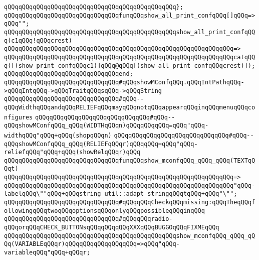 \verb|qQQqqQQqqQQqqQQqqQQqqQQqqQQqqQQqqQQqqQQqqQQqqQQq};|\newline
\newline
\verb|qQQqqQQqqQQqqQQqqQQqqQQqqQQqqQQqfunqQQqshow_all_print_confqQQq[]qQQq=>qQQq"";|\newline
\verb|qQQqqQQqqQQqqQQqqQQqqQQqqQQqqQQqqQQqqQQqqQQqqQQqshow_all_print_confqQQq(c1qQQq!qQQqcrest)|\newline
\verb|qQQqqQQqqQQqqQQqqQQqqQQqqQQqqQQqqQQqqQQqqQQqqQQqqQQqqQQqqQQqqQQq=>|\newline
\verb|qQQqqQQqqQQqqQQqqQQqqQQqqQQqqQQqqQQqqQQqqQQqqQQqqQQqqQQqqQQqqQQqcatqQQq([(show_print_confqQQqc1)]qQQq@qQQq[(show_all_print_confqQQqcrest)]);|\newline
\verb|qQQqqQQqqQQqqQQqqQQqqQQqqQQqqQQqend;|\newline
\newline
\verb|qQQqqQQqqQQqqQQqqQQqqQQqqQQqqQQq#qQQqshowMConfqQQq.qQQqIntPathqQQq->qQQqIntqQQq->qQQqTraitqQQqsqQQq->qQQqString|\newline
\verb|qQQqqQQqqQQqqQQqqQQqqQQqqQQqqQQq#qQQq--qQQqWidthqQQqandqQQqRELIEFqQQqmayqQQqnotqQQqappearqQQqinqQQqmenuqQQqconfigures|\newline
\verb|qQQqqQQqqQQqqQQqqQQqqQQqqQQqqQQq#qQQq--qQQqshowMConfqQQq_qQQq(WIDTHqQQqn)qQQqqQQqqQQq=qQQq"qQQq-widthqQQq"qQQq+qQQq(shopqQQqn)|\newline
\verb|qQQqqQQqqQQqqQQqqQQqqQQqqQQqqQQq#qQQq--qQQqshowMConfqQQq_qQQq(RELIEFqQQqr)qQQqqQQq=qQQq"qQQq-reliefqQQq"qQQq+qQQq(showRelqQQqr)qQQq|\newline
\newline
\verb|qQQqqQQqqQQqqQQqqQQqqQQqqQQqqQQqfunqQQqshow_mconfqQQq_qQQq_qQQq(TEXTqQQqt)|\newline
\verb|qQQqqQQqqQQqqQQqqQQqqQQqqQQqqQQqqQQqqQQqqQQqqQQqqQQqqQQqqQQqqQQq=>|\newline
\verb|qQQqqQQqqQQqqQQqqQQqqQQqqQQqqQQqqQQqqQQqqQQqqQQqqQQqqQQqqQQqqQQq"qQQq-labelqQQq\""qQQq+qQQqstring_util::adapt_stringqQQqtqQQq+qQQq"\"";|\newline
\newline
\verb|qQQqqQQqqQQqqQQqqQQqqQQqqQQqqQQq#qQQqqQQqCheckqQQqmissing:qQQqTheqQQqfollowingqQQqtwoqQQqoptionsqQQqonlyqQQqpossibleqQQqinqQQq|\newline
\verb|qQQqqQQqqQQqqQQqqQQqqQQqqQQqqQQq#qQQqqQQqradio-qQQqorqQQqCHECK_BUTTONsqQQqqQQqqQQqXXXqQQqBUGGOqQQqFIXMEqQQq|\newline
\newline
\verb|qQQqqQQqqQQqqQQqqQQqqQQqqQQqqQQqqQQqqQQqqQQqqQQqshow_mconfqQQq_qQQq_qQQq(VARIABLEqQQqr)qQQqqQQqqQQqqQQqqQQq=>qQQq"qQQq-variableqQQq"qQQq+qQQqr;|\newline
